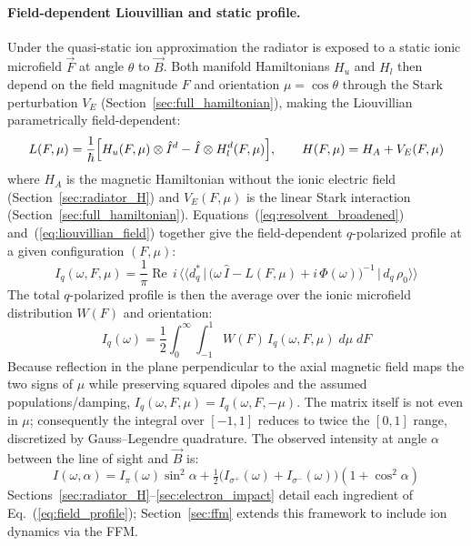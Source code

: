 \documentclass[11pt,a4paper]{article}
\numberwithin{equation}{section}
\begin{document}
\paragraph{Field-dependent Liouvillian and static profile.}
Under the quasi-static ion approximation the radiator is exposed to a static ionic
microfield $\vec{F}$ at angle $\theta$ to $\vec{B}$.  Both manifold Hamiltonians $H_u$
and $H_l$ then depend on the field magnitude $F$ and orientation $\mu = \cos\theta$
through the Stark perturbation $V_E$ (Section~\ref{sec:full_hamiltonian}), making the
Liouvillian parametrically field-dependent:
\begin{equation}
\label{eq:liouvillian_field}
L(F,\mu) = \frac{1}{\hbar}\Bigl[H_u(F,\mu)\otimes\hat{I}^d
           - \hat{I}\otimes H_l^d(F,\mu)\Bigr],
\qquad H(F,\mu) = H_A + V_E(F,\mu)
\end{equation}
where $H_A$ is the magnetic Hamiltonian without the ionic electric field (Section~\ref{sec:radiator_H}) and
$V_E(F,\mu)$ is the linear Stark interaction (Section~\ref{sec:full_hamiltonian}).
Equations~(\ref{eq:resolvent_broadened}) and~(\ref{eq:liouvillian_field}) together give
the field-dependent $q$-polarized profile at a given configuration $(F,\mu)$:
\begin{equation}
\label{eq:field_profile}
I_q(\omega,F,\mu) = \frac{1}{\pi}\operatorname{Re}\,
  i\,\langle\langle d_q^*\,\big|\,
  \bigl(\omega\,\hat{I} - L(F,\mu) + i\,\Phi(\omega)\bigr)^{-1}
  \,\big|\,d_q\,\rho_0\rangle\rangle
\end{equation}
The total $q$-polarized profile is then the average over the ionic microfield
distribution $W(F)$ and orientation:
\begin{equation}
\label{eq:microfield_integral}
I_q(\omega) = \frac{1}{2}\int_0^{\infty}\!\int_{-1}^{1}
  W(F)\,I_q(\omega,F,\mu)\;d\mu\;dF
\end{equation}
Because reflection in the plane perpendicular to the axial magnetic field maps the two signs of $\mu$ while preserving squared dipoles and the assumed populations/damping, $I_q(\omega,F,\mu)=I_q(\omega,F,-\mu)$. The matrix itself is not even in $\mu$; consequently the integral over $[-1,1]$
reduces to twice the $[0,1]$ range, discretized by Gauss--Legendre quadrature.
The observed intensity at angle $\alpha$ between the line of sight and $\vec{B}$ is:
\begin{equation}
\label{eq:stokes}
I(\omega,\alpha) = I_\pi(\omega)\sin^2\!\alpha
  + \tfrac{1}{2}\bigl(I_{\sigma^+}(\omega)+I_{\sigma^-}(\omega)\bigr)(1+\cos^2\!\alpha)
\end{equation}
Sections~\ref{sec:radiator_H}--\ref{sec:electron_impact} detail each ingredient
of Eq.~(\ref{eq:field_profile}); Section~\ref{sec:ffm} extends this framework to include
ion dynamics via the FFM.
\end{document}

